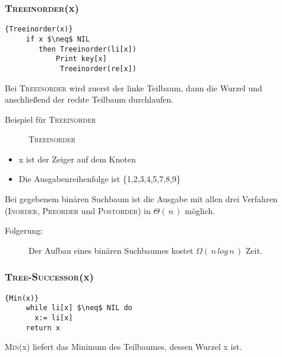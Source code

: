  \subsubsection{\textsc{Treeinorder}(x)}
   \begin{Algorithmus}[H]	
\begin{lstlisting}[frame=tlrb, mathescape=true, title=\textsc{Treeinorder\textnormal{(x)}}, gobble=4]{Treeinorder(x)}
     if x $\neq$ NIL
        then Treeinorder(li[x])
        	Print key[x]
             Treeinorder(re[x])
\end{lstlisting}

    Bei \textsc{Treeinorder} wird zuerst der linke Teilbaum, dann die 
    Wurzel und anschließend der rechte Teilbaum durchlaufen.
\end{Algorithmus}

  Beispiel für \textsc{Treeinorder}
  \begin{figure}[H]
  \centering  
   \caption{\textsc{Treeinorder}}
   \label{171103d}
  \end{figure}
 \begin{itemize}
  \item x ist der Zeiger auf dem Knoten
  \item Die Ausgabenreihenfolge ist \{1,2,3,4,5,7,8,9\}
 \end{itemize}
 
  \begin{satz}
 Bei gegebenem binären Suchbaum ist die Ausgabe mit allen drei Verfahren (\textsc{Inorder}, 
 \textsc{Preorder} und \textsc{Postorder}) in $\Theta(\,n\,)$ möglich.
 \end{satz}
 \begin{description}
  \item[Folgerung:] Der Aufbau eines binären Suchbaumes kostet $\Omega(\,n\,log\,n\,)$ Zeit.
 \end{description}
 
 \subsubsection{\textsc{Tree-Successor}(x)}
 
   \begin{Algorithmus}[H]
    \begin{lstlisting}[frame=tlrb, mathescape=true, title=\textsc{Min\textnormal{(x)}}, gobble=4]{Min(x)}
     while li[x] $\neq$ NIL do
       x:= li[x]
     return x
    \end{lstlisting}

   \textsc{Min}(x) liefert das Minimum des Teilbaumes, dessen Wurzel x ist.
   \end{Algorithmus}
   
